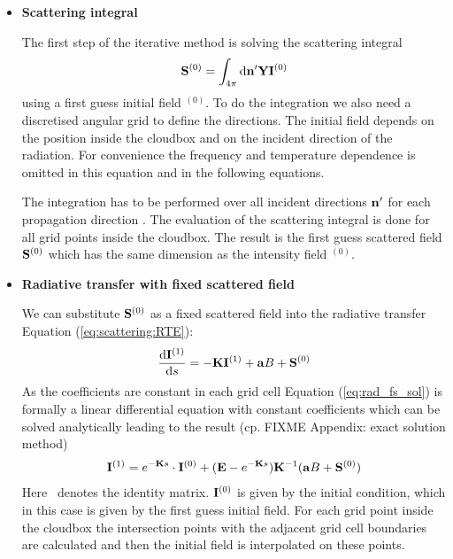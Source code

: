 \begin{itemize}
\item {\bf Scattering integral}

The first step  of the iterative method is solving the scattering integral
\begin{eqnarray}
  {\bf S}^{(0)} = \int_{4\pi} \mathrm{d} {\bf n}^\prime
  {\bf Y} {\bf I}^{(0)}
\end{eqnarray}
using a first guess initial field \StoVec$^{(0)}$. To do the
integration we also need a discretised angular grid to define the
directions. The initial field depends on the
position inside the cloudbox and on the incident direction of the
radiation. For
convenience the frequency and temperature dependence is omitted in
this equation and in the following equations. 

The integration has to be performed over all incident directions
${\bf n}^\prime$ for each 
propagation direction \PDir{}. The evaluation of the scattering
integral is done for all grid points inside the cloudbox. The result
is the first guess scattered field ${\bf S}^{(0)}$
which has the same dimension as the intensity field \StoVec$^{(0)}$. 




\item{\bf Radiative transfer with fixed scattered field}

We can substitute  ${\bf S}^{(0)}$ as a fixed scattered field into the
radiative transfer 
Equation (\ref{eq:scattering:RTE}):   
\begin{eqnarray}
     \frac{\mathrm{d} {\bf I}^{(1)}}{\mathrm{d} s} =
     -{\bf K} {\bf I}^{(1)} + {\bf a} B
     +{\bf S}^{(0)}
\label{eq:rad_fs_sol}
\end{eqnarray} 
As the coefficients are constant in each
grid cell Equation (\ref{eq:rad_fs_sol}) is formally a linear differential
equation with constant coefficients which can be solved analytically
leading to the result (cp. FIXME Appendix: exact solution method) 
\begin{eqnarray}
  \label{eq:scattering:RTE_sol}
  {\bf I}^{(1)} = e^{-{\bf K} s}\cdot{\bf I}^{(0)} + ({\bf E} - e^{-{\bf K}
    s}) {\bf K}^{-1} ({\bf a} B + {\bf S}^{(0)})
\end{eqnarray}
Here \IdnMat\ denotes the identity matrix. 
${\bf I}^{(0)}$ is given by the initial condition, which in this
case is given by the first guess initial field. For each grid
point inside the cloudbox the intersection points with the adjacent
grid cell boundaries are calculated and then the initial field is
interpolated on these points.


\end{itemize}
